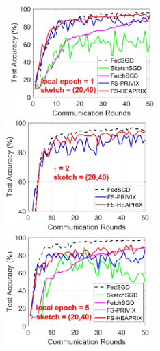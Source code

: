 \documentclass{article}
\begin{document}
\begin{figure}[H]
\begin{center}
		\mbox{\hspace{-0.15in}	
		\includegraphics[width=2.2in]{MNIST_figures/local1_sketch20_iid0_test_acc.eps} \hspace{-0.15in}
		\includegraphics[width=2.2in]{MNIST_figures/local2_sketch20_iid0_test_acc.eps} \hspace{-0.15in}
		\includegraphics[width=2.2in]{MNIST_figures/local5_sketch20_iid0_test_acc.eps}
		}
		

\end{center}
\end{figure}
\end{document}
